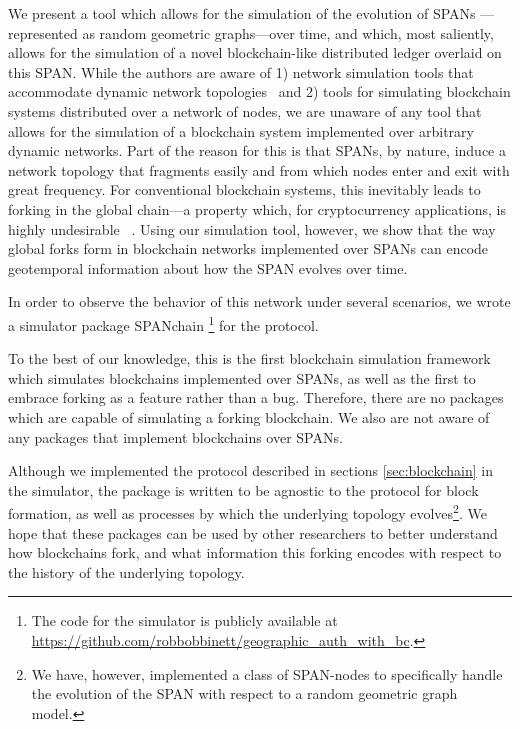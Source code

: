 We present a tool which allows for the simulation of the evolution of SPANs
---represented as random geometric graphs---over time, and which, most saliently,
allows for the simulation of a novel blockchain-like distributed ledger overlaid
on this SPAN. While the authors are aware of 1) network simulation tools that
accommodate dynamic network topologies~\cite{chaudhary2012study} and
2) tools for simulating blockchain
systems distributed over a network of nodes, we are unaware of any tool that
allows for the simulation of a blockchain system implemented over arbitrary dynamic
networks. Part of the reason for this is that SPANs, by nature, induce a network topology
that fragments easily and from which nodes enter and exit with great frequency. For
conventional blockchain systems, this inevitably leads to forking in the global
chain---a property which, for cryptocurrency applications, is highly undesirable
~\cite{decker_2013,nakamoto2008bitcoin}. Using our simulation tool, however, we show
that the way global forks form in blockchain networks implemented over SPANs can encode
geotemporal information about how the SPAN evolves over time.

In order to observe the behavior of this network under several scenarios,
we wrote a simulator package SPANchain%
\footnote{
	The code for the simulator is publicly available at
	\url{https://github.com/robbobbinett/geographic_auth_with_bc}.
}
for the protocol.

To the best of our knowledge,
this is the first blockchain simulation framework which simulates
blockchains implemented over SPANs, as well as the first
to embrace forking as a feature rather than a bug.
Therefore,
there are no packages which are capable of simulating a forking blockchain.
We also are not aware of any packages that implement blockchains over SPANs.

Although we implemented the protocol described in sections
\ref{sec:blockchain} in the simulator,
the package is written to be agnostic to the protocol for block formation,
as well as processes by which the underlying topology evolves\footnote{We have,
	however, implemented a class of SPAN-nodes to specifically handle
	the evolution of the SPAN with respect to a random geometric graph model.}.
We hope that these packages can be used by other researchers
to better understand how blockchains fork, and what information this forking
encodes with respect to the history of the underlying topology.
